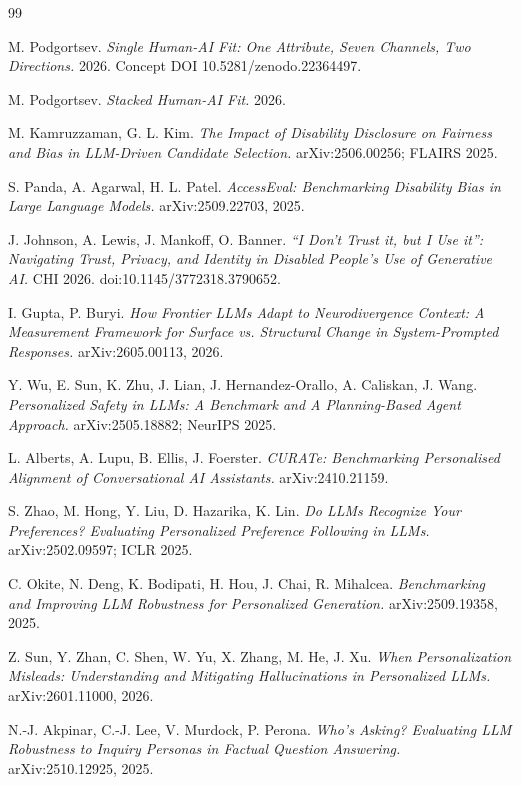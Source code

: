 \documentclass[11pt]{article}
\begin{document}
\begin{thebibliography}{99}

 M. Podgortsev. \emph{Single Human-AI Fit: One Attribute, Seven
Channels, Two Directions.} 2026. Concept DOI 10.5281/zenodo.22364497.

 M. Podgortsev. \emph{Stacked Human-AI Fit.} 2026.

 M. Kamruzzaman, G. L. Kim. \emph{The Impact of Disability
Disclosure on Fairness and Bias in LLM-Driven Candidate Selection.}
arXiv:2506.00256; FLAIRS 2025.

 S. Panda, A. Agarwal, H. L. Patel. \emph{AccessEval:
Benchmarking Disability Bias in Large Language Models.} arXiv:2509.22703, 2025.

 J. Johnson, A. Lewis, J. Mankoff, O. Banner. \emph{``I Don't
Trust it, but I Use it'': Navigating Trust, Privacy, and Identity in Disabled
People's Use of Generative AI.} CHI 2026. doi:10.1145/3772318.3790652.

 I. Gupta, P. Buryi. \emph{How Frontier LLMs Adapt to
Neurodivergence Context: A Measurement Framework for Surface vs. Structural Change
in System-Prompted Responses.} arXiv:2605.00113, 2026.

 Y. Wu, E. Sun, K. Zhu, J. Lian, J. Hernandez-Orallo,
A. Caliskan, J. Wang. \emph{Personalized Safety in LLMs: A Benchmark and A
Planning-Based Agent Approach.} arXiv:2505.18882; NeurIPS 2025.

 L. Alberts, A. Lupu, B. Ellis, J. Foerster. \emph{CURATe: Benchmarking
Personalised Alignment of Conversational AI Assistants.} arXiv:2410.21159.

 S. Zhao, M. Hong, Y. Liu, D. Hazarika, K. Lin. \emph{Do LLMs
Recognize Your Preferences? Evaluating Personalized Preference Following in LLMs.}
arXiv:2502.09597; ICLR 2025.

 C. Okite, N. Deng, K. Bodipati, H. Hou, J. Chai, R. Mihalcea.
\emph{Benchmarking and Improving LLM Robustness for Personalized Generation.}
arXiv:2509.19358, 2025.

 Z. Sun, Y. Zhan, C. Shen, W. Yu, X. Zhang, M. He, J. Xu.
\emph{When Personalization Misleads: Understanding and Mitigating Hallucinations in
Personalized LLMs.} arXiv:2601.11000, 2026.

 N.-J. Akpinar, C.-J. Lee, V. Murdock, P. Perona. \emph{Who's
Asking? Evaluating LLM Robustness to Inquiry Personas in Factual Question
Answering.} arXiv:2510.12925, 2025.


\end{thebibliography}
\end{document}
